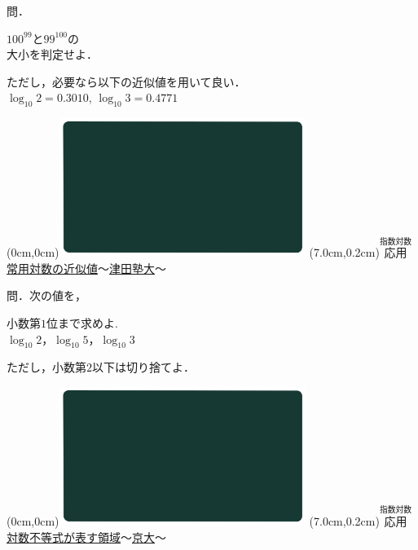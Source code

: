 \documentclass[10pt,
fleqn,
dvipdfmx,
uplatex
]{jsarticle}
\begin{document}
\normalsize
問．

\Huge
\vspace{-1zw}
\hspace{0.5zw}
${100}^{99}$と${99}^{100}$の\vspace{-0.2zw}\\
\hspace{0.3zw} 大小を判定せよ．

\normalsize
\vspace{0.2zw}
\hfill ただし，必要なら以下の近似値を用いて良い．\\
\hfill$\log _{{10}}2=0.{3010}$,\; $\log _{{10}}3=0.{4771}$


\newpage



\at(0cm,0cm){\includegraphics[width=8cm,bb=0 0 1920 1080]{./youtube/thumbnails/templates/smart_background/指数対数.jpeg}}
\at(7.0cm,0.2cm){\small\color{bradorange}$\overset{\text{指数対数}}{\text{応用}}$}
{\color{orange}\Large\underline{常用対数の近似値$〜$津田塾大$〜$}}\vspace{0.3zw}

\normalsize
問．次の値を，

\huge
\hspace{0.1zw}
小数第$1$位まで求めよ.\vspace{-0.2zw}\\
$\log _{10}2$，$\log _{10}5$，$\log _{10}3$

\normalsize
\vspace{0.8zw}
\hfill 
ただし，小数第$2$以下は切り捨てよ．


\newpage



\at(0cm,0cm){\includegraphics[width=8cm,bb=0 0 1920 1080]{./youtube/thumbnails/templates/smart_background/指数対数.jpeg}}
\at(7.0cm,0.2cm){\small\color{bradorange}$\overset{\text{指数対数}}{\text{応用}}$}
{\color{orange}\Large\underline{対数不等式が表す領域$〜$京大$〜$}}\vspace{0.1zw}
\end{document}
